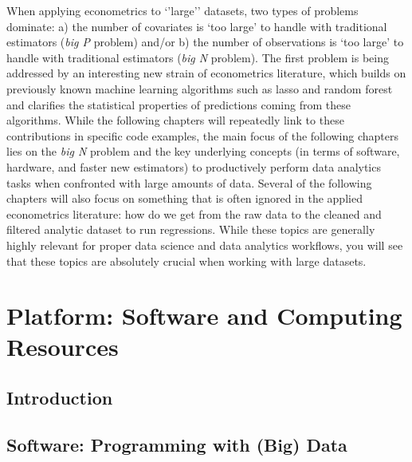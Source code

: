 \documentclass[
  12pt,
]{style/krantz}
\begin{document}
When applying econometrics to `'large'' datasets, two types of problems dominate: a) the number of covariates is `too large' to handle with traditional estimators (\emph{big P} problem) and/or b) the number of observations is `too large' to handle with traditional estimators (\emph{big N} problem). The first problem is being addressed by an interesting new strain of econometrics literature, which builds on previously known machine learning algorithms such as lasso and random forest and clarifies the statistical properties of predictions coming from these algorithms. While the following chapters will repeatedly link to these contributions in specific code examples, the main focus of the following chapters lies on the \emph{big N} problem and the key underlying concepts (in terms of software, hardware, and faster new estimators) to productively perform data analytics tasks when confronted with large amounts of data. Several of the following chapters will also focus on something that is often ignored in the applied econometrics literature: how do we get from the raw data to the cleaned and filtered analytic dataset to run regressions. While these topics are generally highly relevant for proper data science and data analytics workflows, you will see that these topics are absolutely crucial when working with large datasets.

\hypertarget{part-platform-software-and-computing-resources}{%
\part{Platform: Software and Computing Resources}\label{part-platform-software-and-computing-resources}}

\hypertarget{p}{%
\chapter*{Introduction}\label{p}}



\hypertarget{software-programming-with-big-data}{%
\chapter{Software: Programming with (Big) Data}\label{software-programming-with-big-data}}
\end{document}
